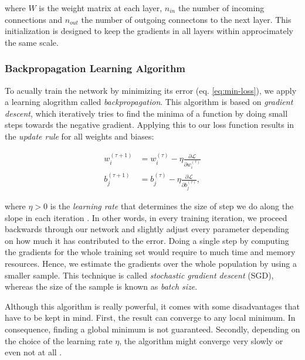 where $ W $ is the weight matrix at each layer, $ n_{in} $ the number of incoming connections and $ n_{out} $ the number of outgoing connectons to the next layer. This initialization is designed to keep the gradients in all layers within approcimately the same scale.

\subsubsection{Backpropagation Learning Algorithm}

To acually train the network by minimizing its error (eq. \ref{eq:min-loss}), we apply a learning alogrithm called \textit{backpropagation}. This algorithm is based on \textit{gradient descent}, which iteratively tries to find the minima of a function by doing small steps towards the negative gradient. Applying this to our loss function results in the \textit{update rule} for all weights and biases:

\begin{equation} \label{eq:gradient_descent}
\begin{aligned}
w_{i}^{(\tau + 1)} &= w_{i}^{(\tau)} - \eta \frac{\partial \mathcal{L}}{\partial w_{i}^{(\tau)}} \\
b_{j}^{(\tau + 1)} &= b_{j}^{(\tau)} - \eta \frac{\partial \mathcal{L}}{\partial b_{j}^{(\tau)}} ,
\end{aligned}
\end{equation}

where $ \eta > 0 $ is the \textit{learning rate} that determines the size of step we do along the slope in each iteration \parencite{pattern_and_ml}. In other words, in every training iteration, we proceed backwards through our network and slightly adjust every parameter depending on how much it has contributed to the error. Doing a single step by computing the gradients for the whole training set would require to much time and memory resources. Hence, we estimate the gradients over the whole population by using a smaller sample. This technique is called \textit{stochastic gradient descent} (SGD), whereas the size of the sample is known as \textit{batch size}.

Although this algorithm is really powerful, it comes with some disadvantages that have to be kept in mind. First, the result can converge to any local minimum. In consequence, finding a global minimum is not guaranteed. Secondly, depending on the choice of the learning rate $ \eta $, the algorithm might converge very slowly or even not at all \parencite{ann}.

